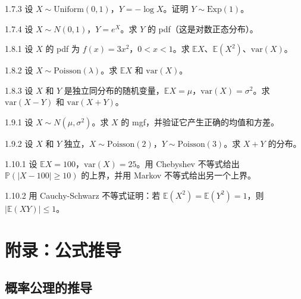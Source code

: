 \begin{exercise}{1.7.3}
设 $X \sim \text{Uniform}(0, 1)$，$Y = -\log X$。证明 $Y \sim \text{Exp}(1)$。
\end{exercise}

\begin{exercise}{1.7.4}
设 $X \sim N(0, 1)$，$Y = e^X$。求 $Y$ 的 pdf（这是对数正态分布）。
\end{exercise}

\begin{exercise}{1.8.1}
设 $X$ 的 pdf 为 $f(x) = 3x^2$，$0 < x < 1$。求 $\mathbb{E}X$、$\mathbb{E}(X^2)$、$\text{var}(X)$。
\end{exercise}

\begin{exercise}{1.8.2}
设 $X \sim \text{Poisson}(\lambda)$。求 $\mathbb{E}X$ 和 $\text{var}(X)$。
\end{exercise}

\begin{exercise}{1.8.3}
设 $X$ 和 $Y$ 是独立同分布的随机变量，$\mathbb{E}X = \mu$，$\text{var}(X) = \sigma^2$。求 $\text{var}(X - Y)$ 和 $\text{var}(X + Y)$。
\end{exercise}

\begin{exercise}{1.9.1}
设 $X \sim N(\mu, \sigma^2)$。求 $X$ 的 mgf，并验证它产生正确的均值和方差。
\end{exercise}

\begin{exercise}{1.9.2}
设 $X$ 和 $Y$ 独立，$X \sim \text{Poisson}(2)$，$Y \sim \text{Poisson}(3)$。求 $X + Y$ 的分布。
\end{exercise}

\begin{exercise}{1.10.1}
设 $\mathbb{E}X = 100$，$\text{var}(X) = 25$。用 Chebyshev 不等式给出 $\mathbb{P}(|X - 100| \geq 10)$ 的上界，并用 Markov 不等式给出另一个上界。
\end{exercise}

\begin{exercise}{1.10.2}
用 Cauchy-Schwarz 不等式证明：若 $\mathbb{E}(X^2) = \mathbb{E}(Y^2) = 1$，则 $|\mathbb{E}(XY)| \leq 1$。
\end{exercise}

\section{附录：公式推导}\label{sec:appendix-ch1}

\subsection{概率公理的推导}\label{sec:derivation-probability-axioms}


